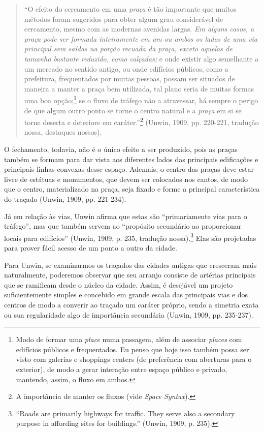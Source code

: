 \documentclass[12pt, a4paper]{book} %
\begin{document}
        \begin{quotation}
            ``O efeito do cercamento em uma \textit{praça} é tão importante que muitos métodos foram sugeridos para obter algum grau considerável de cercamento, mesmo com as modernas avenidas largas. \textit{Em alguns casos, a praça pode ser formada inteiramente em um ou ambos os lados de uma via principal sem saídas na porção recuada da praça, exceto aquelas de tamanho bastante reduzido, como calçadas;} e onde existir algo semelhante a um mercado no sentido antigo, ou onde edifícios públicos, como a prefeitura, frequentados por muitas pessoas, possam ser situados de maneira a manter a praça bem utilizada, tal plano seria de muitas formas uma boa opção;\footnote[10]{Modo de formar uma \textit{place} numa passagem, além de associar \textit{places} com edifícios públicos e frequentados.
            Eu penso que hoje isso também possa ser visto com galerias e shoppings centers (de preferência com aberturas para o exterior), de modo a gerar interação entre espaço público e privado, mantendo, assim, o fluxo em ambos.} se o fluxo de tráfego não a atravessar, há sempre o perigo de que algum outro ponto se torne o centro natural e a \textit{praça} em si se torne deserta e deteriore em caráter.''\footnote[11]{A importância de manter os fluxos (vide \textit{Space Syntax}).} (Unwin, 1909, pp. 220-221, tradução nossa, destaques nossos).
        \end{quotation}

        O fechamento, todavia, não é o único efeito a ser produzido, pois as praças também se formam para dar vista aos diferentes lados das principais edificações e principais linhas convexas desse espaço. Ademais, o centro das praças deve estar livre de estátuas e monumentos, que devem ser colocados nos cantos, de modo que o centro, materializado na praça, seja fixado e forme a principal característica do traçado (Unwin, 1909, pp. 221-234).

        Já em relação às vias, Unwin afirma que estas são ``primariamente vias para o tráfego'', mas que também servem ao ``propósito secundário ao proporcionar locais para edifícios'' (Unwin, 1909, p. 235, tradução nossa).\footnote[12]{``Roads are primarily highways for traffic. They serve also a secondary purpose in affording sites for buildings.'' (Unwin, 1909, p. 235).} Elas são projetadas para prover fácil acesso de um ponto a outro da cidade.

        Para Unwin, se examinarmos os traçados das cidades antigas que cresceram mais naturalmente, poderemos observar que seu arranjo consiste de artérias principais que se ramificam desde o núcleo da cidade. Assim, é desejável um projeto suficientemente simples e concebido em grande escala das principais vias e dos centros de modo a converir ao traçado um caráter próprio, sendo a simetria exata ou sua regularidade algo de importância secundária (Unwin, 1909, pp. 235-237).
\end{document}
